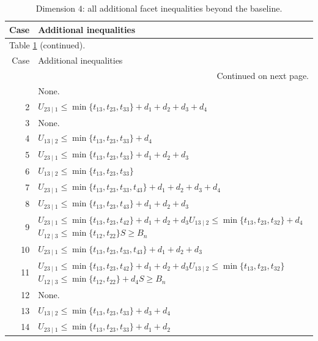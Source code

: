 \documentclass[a4paper,11pt]{amsart}
\numberwithin{equation}{section}
\theoremstyle{definition}
\theoremstyle{remark}
\begin{document}
\clearpage
{\small\setlength{\tabcolsep}{4.5pt}
\begin{longtable}{@{}r>{\raggedright\arraybackslash}p{12.9cm}@{}}
\caption{Dimension $ 4$: all additional facet inequalities beyond the baseline.}\label{tab:extras-n4}\\
\toprule
Case & Additional inequalities\\
\midrule\endfirsthead
\multicolumn{2}{l}{\small Table \ref{tab:extras-n4} (continued).}\\
\toprule
Case & Additional inequalities\\
\midrule\endhead
\midrule
\multicolumn{2}{r}{\small Continued on next page.}\\
\endfoot\bottomrule\endlastfoot
1 & None.\\
2 & \(U_{23\mid 1}\leq \min\{t_{13},t_{23},t_{33}\}+d_{1}+d_{2}+d_{3}+d_{4}\)\\
3 & None.\\
4 & \(U_{13\mid 2}\leq \min\{t_{13},t_{23},t_{33}\}+d_{4}\)\\
5 & \(U_{23\mid 1}\leq \min\{t_{13},t_{23},t_{33}\}+d_{1}+d_{2}+d_{3}\)\\
6 & \(U_{13\mid 2}\leq \min\{t_{13},t_{23},t_{33}\}\)\\
7 & \(U_{23\mid 1}\leq \min\{t_{13},t_{23},t_{33},t_{43}\}+d_{1}+d_{2}+d_{3}+d_{4}\)\\
8 & \(U_{23\mid 1}\leq \min\{t_{13},t_{23},t_{43}\}+d_{1}+d_{2}+d_{3}\)\\
9 & \(U_{23\mid 1}\leq \min\{t_{13},t_{23},t_{42}\}+d_{1}+d_{2}+d_{3}\)\newline \(U_{13\mid 2}\leq \min\{t_{13},t_{23},t_{32}\}+d_{4}\)\newline \(U_{12\mid 3}\leq \min\{t_{12},t_{22}\}\)\newline \(S\geq B_n\)\\
10 & \(U_{23\mid 1}\leq \min\{t_{13},t_{23},t_{33},t_{43}\}+d_{1}+d_{2}+d_{3}\)\\
11 & \(U_{23\mid 1}\leq \min\{t_{13},t_{23},t_{42}\}+d_{1}+d_{2}+d_{3}\)\newline \(U_{13\mid 2}\leq \min\{t_{13},t_{23},t_{32}\}\)\newline \(U_{12\mid 3}\leq \min\{t_{12},t_{22}\}+d_{4}\)\newline \(S\geq B_n\)\\
12 & None.\\
13 & \(U_{13\mid 2}\leq \min\{t_{13},t_{23},t_{33}\}+d_{3}+d_{4}\)\\
14 & \(U_{23\mid 1}\leq \min\{t_{13},t_{23},t_{33}\}+d_{1}+d_{2}\)\\

\end{longtable}}
\end{document}

